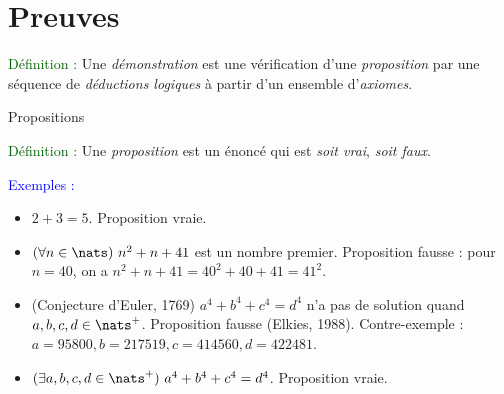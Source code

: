 \part{Preuves}

\begin{frame}
\textcolor{darkgreen}{Définition :} Une {\em démonstration} est une 
vérification d'une {\em proposition} par une séquence
de {\em déductions logiques} à partir d'un ensemble d'{\em axiomes}.
\end{frame}

\begin{frame}{Propositions}

\textcolor{darkgreen}{Définition :} 
Une {\em proposition} est un énoncé qui est {\em soit vrai},
{\em soit faux}.

\textcolor{blue}{Exemples :}
\begin{itemize}
\item $2+ 3 = 5$. Proposition vraie.
\item $(\forall n \in \nats)~n^2 + n + 41$ est un nombre premier. 
Proposition fausse : pour $n = 40$, on a $n^2 + n + 41 = 40^2 + 40 + 41
= 41^2$.
\item (Conjecture d'Euler, 1769) $a^4 + b^4 + c^4 = d^4$ n'a pas de solution
quand $a,b,c,d \in \nats^+$.  Proposition fausse (Elkies, 1988).
Contre-exemple : $a = 95800,
b = 217519, c =414560, d = 422481$.
\item $(\exists a,b,c,d \in \nats^+)~a^4 + b^4 + c^4 = d^4$.  Proposition
vraie. 
\end{itemize}
\end{frame}

